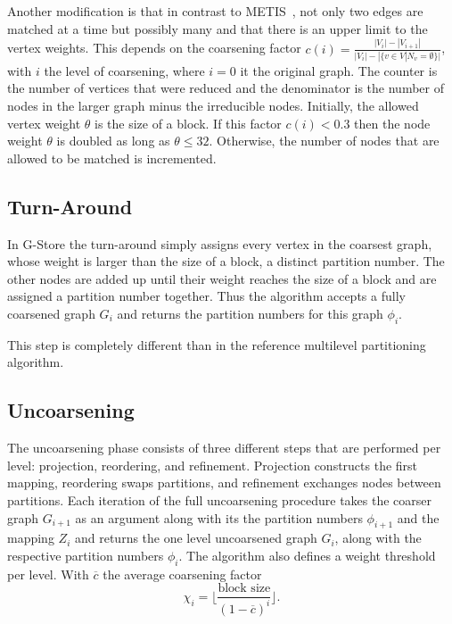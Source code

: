     Another modification is that in contrast to METIS~\autocite{karypis}, not only two edges are matched at a time but possibly many and that there is an upper limit to the vertex weights. 
    This depends on the coarsening factor $c(i) = \frac{|V_i| - |V_{i+1}|}{|V_i| - |\{v \in V | N_v = \emptyset \}|}$, with $i$ the level of coarsening, where $i=0$ it the original graph.
    The counter is the number of vertices that were reduced and the denominator is the number of nodes in the larger graph minus the irreducible nodes.
    Initially, the allowed vertex weight $\theta$ is the size of a block.
    If this factor $c(i) < 0.3$ then the node weight $\theta$ is doubled as long as $\theta \leq 32$.
    Otherwise, the number of nodes that are allowed to be matched is incremented.
        
    \subsection*{Turn-Around}
    In G-Store the turn-around simply assigns every vertex in the coarsest graph, whose weight is larger than the size of a block, a distinct partition number.
    The other nodes are added up until their weight reaches the size of a block and are assigned a partition number together.
    Thus the algorithm accepts a fully coarsened graph $G_i$ and returns the partition numbers for this graph $\phi_i$.
    
    This step is completely different than in the reference multilevel partitioning algorithm.

    
    \subsection*{Uncoarsening}
    The uncoarsening phase consists of three different steps that are performed per level:
    projection, reordering, and refinement.
    Projection constructs the first mapping, reordering swaps partitions, and refinement exchanges nodes between partitions.
    Each iteration of the full uncoarsening procedure takes the coarser graph $G_{i+1}$ as an argument along with its the partition numbers $\phi_{i+1}$ and the mapping $Z_{i}$ and returns the one level uncoarsened graph $G_i$, along with the respective partition numbers $\phi_i$.
    The algorithm also defines a weight threshold per level. With $\overline{c}$ the average coarsening factor
    \[ \chi_i = \lfloor \frac{\text{block size}}{(1-\overline{c})^i} \rfloor. \]
    
